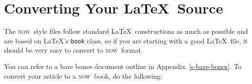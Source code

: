 \documentclass[openany]{now} %
\newcommand{\now}{\textsc{now}}
\begin{document}
\iffalse
\section{Creating the output PDF file}
You create a PDF file by running the following commands:
\begin{verbatim}
pdflatex paper.tex
bibtex paper.tex
pdflatex paper.tex
pdflatex paper.tex
\end{verbatim}
You need to run \texttt{pdflatex} twice only to ensure that all the references are
up to date. If you are using a package that requires the use of PostScript, like
\texttt{psfrag}, then you should instead use the following:
\begin{verbatim}
latex paper.tex
bibtex paper.tex
latex paper.tex
latex paper.tex
dvipdf paper.dvi
\end{verbatim}
We recommend using \texttt{pdflatex} unless you have a good reason not to.
If you are unfamiliar with any of this, see Lamport~\citep{Lam:94} or any
other standard \LaTeX\ references.
\fi

\chapter{Converting Your \LaTeX\ Source}
\label{c-converting}

The \now\ style files follow standard \LaTeX\ constructions as much as possible
and are based on \LaTeX's \texttt{book} class,
so if you are starting with a good \LaTeX\ file, it should be very easy
to convert to \now\ format.

You can refer to a bare bones document outline in Appendix~\ref{s-bare-bones}.
To convert your article to a \now\ book, do the following:
\end{document}
